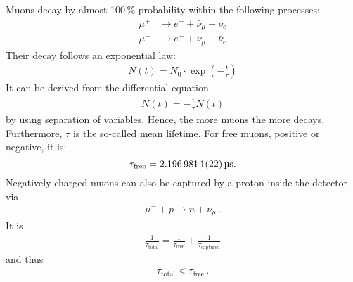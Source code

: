 Muons decay by almost 100\,\% probability within the following processes:
\begin{align}
	\mu^+&\longrightarrow e^++\bar{\nu}_\mu+\nu_e\\
	\mu^-&\longrightarrow e^-+\nu_\mu+\bar{\nu}_e
\end{align}
Their decay follows an exponential law:
\begin{align}
	N(t)=N_0\cdot\exp\left(-\frac{t}{\tau}\right)
\end{align}
It can be derived from the differential equation
\begin{align}
	\dot{N}(t)=-\frac{1}{\tau}N(t)
\end{align}
by using separation of variables.
Hence, the more muons the more decays.
Furthermore, $\tau$ is the so-called mean lifetime.
For free muons, positive or negative, it is\cite{pdg}:
\begin{equation}
	\tau_\text{free} = \SI{2.1969811 \pm 0.0000022}{\micro\second}.
\end{equation}
Negatively charged muons can also be captured by a proton inside the detector via
\begin{align}
	\mu^-+p \longrightarrow n+\nu_\mu\,.
\end{align}
It is 
\begin{align}
	\frac{1}{\tau_\text{total}}=\frac{1}{\tau_\text{free}}+\frac{1}{\tau_\text{captured}}
\end{align}
and thus
\begin{align}
	\tau_\text{total}<\tau_\text{free}\,.
\end{align}

